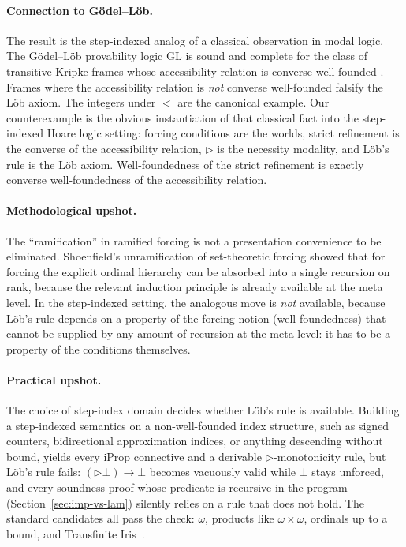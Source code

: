 \paragraph{Connection to G\"odel--L\"ob.}
The result is the step-indexed analog of a classical observation in
modal logic.  The G\"odel--L\"ob provability logic \textsf{GL} is
sound and complete for the class of transitive Kripke frames whose
accessibility relation is converse well-founded
\cite{smorynski1985,boolos1993}.  Frames where the accessibility
relation is \emph{not} converse well-founded falsify the Löb axiom.
The integers under $<$ are the canonical example.  Our
counterexample is the obvious instantiation of that classical fact
into the step-indexed Hoare logic setting: forcing conditions are
the worlds, strict refinement is the converse of the accessibility
relation, $\triangleright$ is the necessity modality, and Löb's rule
is the Löb axiom.  Well-foundedness of the strict refinement is
exactly converse well-foundedness of the accessibility relation.

\paragraph{Methodological upshot.}
The ``ramification'' in ramified forcing is not a presentation
convenience to be eliminated.  Shoenfield's unramification of
set-theoretic forcing showed that for forcing the explicit ordinal
hierarchy can be absorbed into a single recursion on rank, because
the relevant induction principle is already available at the
meta level.  In the step-indexed setting, the analogous move is
\emph{not} available, because Löb's rule depends on a property of
the forcing notion (well-foundedness) that cannot be supplied by any
amount of recursion at the meta level: it has to be a property of
the conditions themselves.

\paragraph{Practical upshot.}
The choice of step-index domain decides whether L\"ob's rule is
available.  Building a step-indexed semantics on a non-well-founded
index structure, such as signed counters, bidirectional approximation
indices, or anything descending without bound, yields every iProp
connective and a derivable $\triangleright$-monotonicity rule, but
L\"ob's rule fails: $(\triangleright \bot) \to \bot$ becomes
vacuously valid while $\bot$ stays unforced, and every soundness
proof whose predicate is recursive in the program
(Section~\ref{sec:imp-vs-lam}) silently relies on a rule that does
not hold.  The standard candidates all pass the check: $\omega$,
products like $\omega \times \omega$, ordinals up to a bound, and
Transfinite Iris~\cite{spies2021transfinite}.

